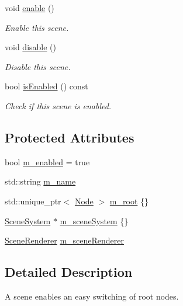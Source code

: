 \begin{DoxyCompactItemize}
void \mbox{\hyperlink{classec_1_1_scene_ab1788ac3be0db2d82ee2f8c5fa0cecef}{enable}} ()
\begin{DoxyCompactList}\small\item\em Enable this scene. \end{DoxyCompactList}\item 
void \mbox{\hyperlink{classec_1_1_scene_a05bf59f23abb809000ad17bdb00cab94}{disable}} ()
\begin{DoxyCompactList}\small\item\em Disable this scene. \end{DoxyCompactList}\item 
bool \mbox{\hyperlink{classec_1_1_scene_a0748d645ee5204e64d674c1b10b26864}{is\+Enabled}} () const
\begin{DoxyCompactList}\small\item\em Check if this scene is enabled. \end{DoxyCompactList}\end{DoxyCompactItemize}
\subsection*{Protected Attributes}
\begin{DoxyCompactItemize}
\item 
bool \mbox{\hyperlink{classec_1_1_scene_ad68ba7af20ecfbc45ee136842a38ccfe}{m\+\_\+enabled}} = true
\item 
std\+::string \mbox{\hyperlink{classec_1_1_scene_a58a25f1f2370535750e341085ddfd95b}{m\+\_\+name}}
\item 
std\+::unique\+\_\+ptr$<$ \mbox{\hyperlink{classec_1_1_node}{Node}} $>$ \mbox{\hyperlink{classec_1_1_scene_a7b7f1f4840087d56148e4c4be5737b50}{m\+\_\+root}} \{\}
\item 
\mbox{\hyperlink{classec_1_1_scene_system}{Scene\+System}} $\ast$ \mbox{\hyperlink{classec_1_1_scene_ad63e472baf8e283c596891384ea98aad}{m\+\_\+scene\+System}} \{\}
\item 
\mbox{\hyperlink{classec_1_1_scene_renderer}{Scene\+Renderer}} \mbox{\hyperlink{classec_1_1_scene_a17a2c241cec6bda0a5895b353aa28fa7}{m\+\_\+scene\+Renderer}}
\end{DoxyCompactItemize}


\subsection{Detailed Description}
A scene enables an easy switching of root nodes. 

